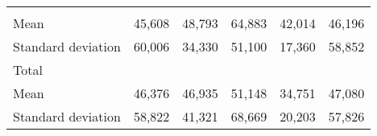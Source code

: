 \begin{tabular}{llllll}
  \multicolumn{1}{|r}{} &
  \multicolumn{1}{r}{} &
  \multicolumn{1}{r}{} &
  \multicolumn{1}{r}{} &
  \multicolumn{1}{r}{} \\
\multicolumn{1}{l}{\hspace{4em}Mean} &
  \multicolumn{1}{|r}{45,608} &
  \multicolumn{1}{r}{48,793} &
  \multicolumn{1}{r}{64,883} &
  \multicolumn{1}{r}{42,014} &
  \multicolumn{1}{r}{46,196} \\
\multicolumn{1}{l}{\hspace{4em}Standard deviation} &
  \multicolumn{1}{|r}{60,006} &
  \multicolumn{1}{r}{34,330} &
  \multicolumn{1}{r}{51,100} &
  \multicolumn{1}{r}{17,360} &
  \multicolumn{1}{r}{58,852} \\
\multicolumn{1}{l}{\hspace{3em}Total} &
  \multicolumn{1}{|r}{} &
  \multicolumn{1}{r}{} &
  \multicolumn{1}{r}{} &
  \multicolumn{1}{r}{} &
  \multicolumn{1}{r}{} \\
\multicolumn{1}{l}{\hspace{4em}Mean} &
  \multicolumn{1}{|r}{46,376} &
  \multicolumn{1}{r}{46,935} &
  \multicolumn{1}{r}{51,148} &
  \multicolumn{1}{r}{34,751} &
  \multicolumn{1}{r}{47,080} \\
\multicolumn{1}{l}{\hspace{4em}Standard deviation} &
  \multicolumn{1}{|r}{58,822} &
  \multicolumn{1}{r}{41,321} &
  \multicolumn{1}{r}{68,669} &
  \multicolumn{1}{r}{20,203} &
  \multicolumn{1}{r}{57,826} \\
\cline{1-6}
\end{tabular}

